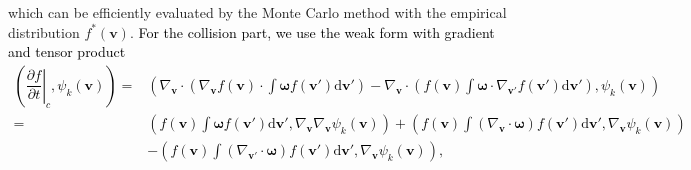 \documentclass[preprint,1p,times]{elsarticle}
\theoremstyle{definition}
\theoremstyle{remark}
\newcommand{\tcb}[1]{\textcolor{black}{#1}}
\newcommand{\tcr}[1]{\textcolor{black}{#1}}
\begin{document}
which can be efficiently evaluated by the Monte Carlo method with the empirical distribution $f^{\ast}(\boldsymbol{v})$.
\tcb{For the collision part, we use the weak form with gradient and tensor product}
\tcr{
\begin{equation}
    \begin{split}
        \left(\left.\dfrac{\partial f}{\partial t}\right|_{c},\psi_k(\boldsymbol{v})\right) 
        =& \left(\nabla_{\boldsymbol{v}} \cdot \left( \nabla_{\boldsymbol{v}} f(\boldsymbol{v})\cdot \int \boldsymbol{\omega} f(\boldsymbol{v}') \mathrm{d}\boldsymbol{v}' \right)
        - \nabla_{\boldsymbol{v}} \cdot \left( f(\boldsymbol{v}) \int \boldsymbol{\omega} \cdot \nabla_{\boldsymbol{v}'} f(\boldsymbol{v}') \mathrm{d}\boldsymbol{v}' \right), \psi_k(\boldsymbol{v}) \right) \\
        =&	\left(f(\boldsymbol{v})\int \boldsymbol{\omega} f(\boldsymbol{v}')\mathrm{d}\boldsymbol{v}', \nabla_{\boldsymbol{v}} \nabla_{\boldsymbol{v}} \psi_k(\boldsymbol{v})\right) 
        + \left( f(\boldsymbol{v}) \int (\nabla_{\boldsymbol{v}} \cdot \boldsymbol{\omega}) f(\boldsymbol{v}') \mathrm{d}\boldsymbol{v}', \nabla_{\boldsymbol{v}} \psi_k (\boldsymbol{v}) \right) \\
        &- \left( f(\boldsymbol{v}) \int (\nabla_{\boldsymbol{v}'} \cdot \boldsymbol{\omega}) f(\boldsymbol{v}') \mathrm{d}\boldsymbol{v}', \nabla_{\boldsymbol{v}} \psi_k (\boldsymbol{v}) \right), \\    
    \end{split}
\end{equation}
}
\end{document}
